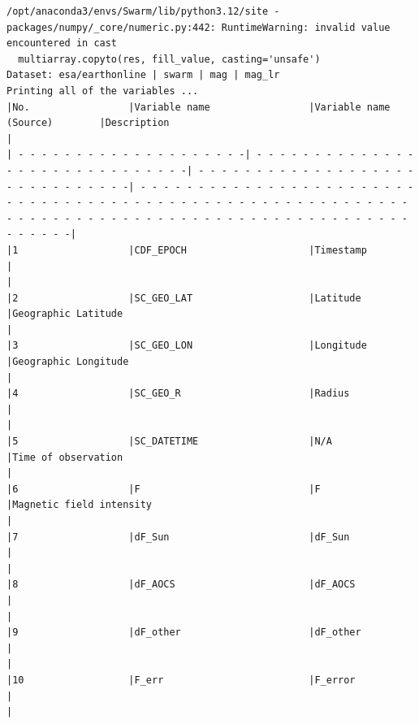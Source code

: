 \begin{verbatim}
/opt/anaconda3/envs/Swarm/lib/python3.12/site -packages/numpy/_core/numeric.py:442: RuntimeWarning: invalid value encountered in cast
  multiarray.copyto(res, fill_value, casting='unsafe')
Dataset: esa/earthonline | swarm | mag | mag_lr
Printing all of the variables ...
|No.                 |Variable name                 |Variable name (Source)        |Description                                                                                         |
| - - - - - - - - - - - - - - - - - - - -| - - - - - - - - - - - - - - - - - - - - - - - - - - - - - -| - - - - - - - - - - - - - - - - - - - - - - - - - - - - - -| - - - - - - - - - - - - - - - - - - - - - - - - - - - - - - - - - - - - - - - - - - - - - - - - - - - - - - - - - - - - - - - - - - - - - - - - - - - - - - - - - - - - - - - - - - - - - - - - - - - -|
|1                   |CDF_EPOCH                     |Timestamp                     |                                                                                                    |
|2                   |SC_GEO_LAT                    |Latitude                      |Geographic Latitude                                                                                 |
|3                   |SC_GEO_LON                    |Longitude                     |Geographic Longitude                                                                                |
|4                   |SC_GEO_R                      |Radius                        |                                                                                                    |
|5                   |SC_DATETIME                   |N/A                           |Time of observation                                                                                 |
|6                   |F                             |F                             |Magnetic field intensity                                                                            |
|7                   |dF_Sun                        |dF_Sun                        |                                                                                                    |
|8                   |dF_AOCS                       |dF_AOCS                       |                                                                                                    |
|9                   |dF_other                      |dF_other                      |                                                                                                    |
|10                  |F_err                         |F_error                       |                                                                                                    |

\end{verbatim}
